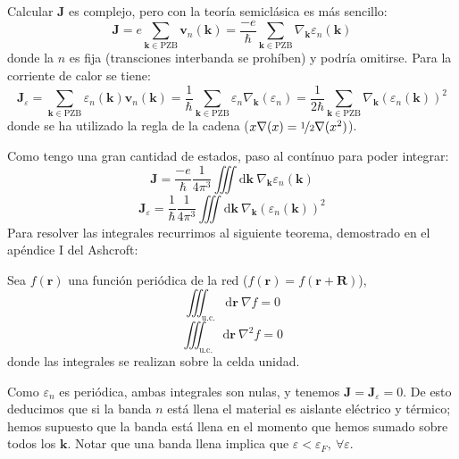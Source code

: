 Calcular $\mathbf{J}$ es complejo, pero con la teoría semiclásica es
más sencillo:
\begin{equation}
  \mathbf{J} = e \sum_{\mathbf{k}\in \text{PZB}} \mathbf{v}_n
  (\mathbf{k}) = \frac{-e}{\hbar} \sum_{\mathbf{k}\in \text{PZB}} \nabla_\mathbf{k}\varepsilon_n(\mathbf{k})
\end{equation}
donde la $n$ es fija (transciones interbanda se prohíben) y podría
omitirse. Para la corriente de calor se tiene:
\begin{equation}
  \mathbf{J}_\varepsilon = \sum_{\mathbf{k}\in \text{PZB}}
  \varepsilon_n(\mathbf{k})\mathbf{v}_n(\mathbf{k}) = \frac{1}{
    \hbar} \sum_{\mathbf{k}\in \text{PZB}} \varepsilon_n
  \nabla_\mathbf{k}(\varepsilon_n) = \frac{1}{
    2\hbar}\sum_{\mathbf{k}\in \text{PZB}} \nabla_\mathbf{k}
  (\varepsilon_n (\mathbf{k}))^2
\end{equation}
donde se ha utilizado la regla de la cadena ($x\nabla(x) = \nicefrac{1}{2}
\nabla(x^2)$).

Como tengo una gran cantidad de estados, paso al contínuo para poder
integrar:
\begin{equation}
  \mathbf{J} = \frac{-e}{\hbar}\frac{1}{4 \pi^3} \iiint
  \text{d}\mathbf{k}\ \nabla_\mathbf{k} \varepsilon_n (\mathbf{k})
\end{equation}
\begin{equation}
  \mathbf{J}_\varepsilon = \frac{1}{\hbar} \frac{1}{4\pi^3} \iiint
  \text{d}\mathbf{k}\ \nabla_\mathbf{k} (\varepsilon_n(\mathbf{k}))^2
\end{equation}
Para resolver las integrales recurrimos al siguiente teorema,
demostrado en el apéndice I del Ashcroft:
\begin{theorem}
  Sea $f(\mathbf{r})$ una función periódica de la red ($f(\mathbf{r})
  = f(\mathbf{r}+\mathbf{R})$),
\begin{equation}
  \iiint_\text{u.c.} \text{d} \mathbf{r}\ \nabla f = 0
\end{equation}
\begin{equation}
  \iiint_\text{u.c.} \text{d} \mathbf{r}\ \nabla ^2f = 0
\end{equation}
donde las integrales se realizan sobre la celda unidad.
\end{theorem}
Como $\varepsilon_n$ es periódica, ambas integrales son nulas, y
tenemos $\mathbf{J} = \mathbf{J}_\varepsilon = 0$. De esto deducimos
que si la banda $n$ está llena el material es aislante eléctrico y
térmico; hemos supuesto que la banda está llena en el momento que
hemos sumado sobre todos los $\mathbf{k}$. Notar que una banda llena
implica que $\varepsilon < \varepsilon_F,\ \forall \varepsilon$.

